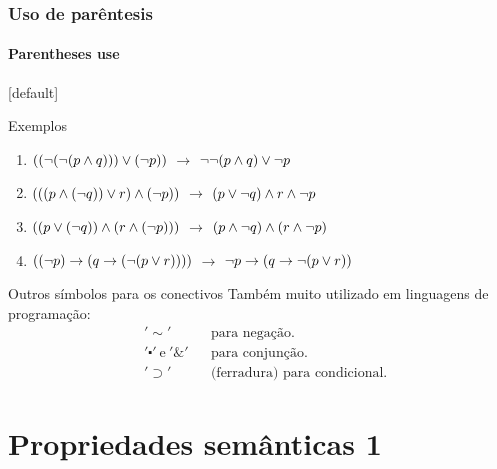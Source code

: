 %
%
\begin{frame}[t]
    \frametitle{Uso de parêntesis}
    \framesubtitle{Parentheses use}
    [default]
    \begin{exampleblock}{Exemplos}
        \begin{enumerate}[\bf 1.]
            \item $((\lnot (\lnot(p \land q))) \lor (\lnot p))$ \qquad $\longrightarrow$ \qquad $\lnot \lnot (p \land q) \lor \lnot p$
            \vspace{2mm}
            \item $(((p \land (\lnot q)) \lor r) \land (\lnot p))$ \qquad $\longrightarrow$ \qquad $(p \lor \lnot q) \land r \land \lnot p$
            \vspace{2mm}
            \item $((p \lor (\lnot q)) \land (r \land (\lnot p)))$ \qquad $\longrightarrow$ \qquad $(p \land \lnot q) \land (r \land \lnot p)$
            \vspace{2mm}
            \item $((\lnot p) \rightarrow (q \rightarrow (\lnot (p \lor r))))$ \qquad $\longrightarrow$ \qquad $\lnot p \rightarrow (q \rightarrow \lnot (p \lor r))$
        \end{enumerate}
    \end{exampleblock}
    \begin{alertblock}{Outros símbolos para os conectivos}
        Também muito utilizado em linguagens de programação:
        \vspace{-2mm}
        \begin{align*}
            &' \sim '                      &     & \text{para negação.}  \\
            &' \centerdot '~\text{e}~'\&'  &     & \text{para conjunção.} \\
            &' \supset '                   &     & \text{(ferradura) para condicional.} 
        \end{align*}
    \end{alertblock}
\end{frame}
%
\section{Propriedades semânticas 1}
%

